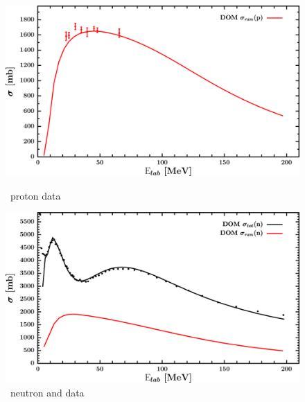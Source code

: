 \begin{figure}[H]
    \centering
    \begin{minipage}{0.45\textwidth}
        \centering
        \includegraphics[width=1.0\textwidth]{figures/sn124_protonInelastic.png}
        \caption{\snFour\ proton \rxn data}
        \label{DOMFitData_sn124_proton_inelastic}
    \end{minipage}\hfill
    \begin{minipage}{0.45\textwidth}
        \centering
        \includegraphics[width=1.0\textwidth]{figures/sn124_neutronInelastic.png}
        \caption{\snFour\ neutron \rxn and \tot data}
        \label{DOMFitData_sn124_neutron_inelastic}
    \end{minipage}
\end{figure}

\afterpage{\clearpage}

